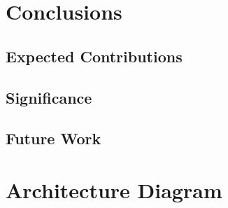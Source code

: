 \documentclass[12pt, a4paper]{article}
\begin{document}
\section{Conclusions}
\label{sec:conclusions}

\subsection{Expected Contributions}


\subsection{Significance}

\subsection{Future Work}


\newpage
\printbibliography

\newpage
\appendix
\section{Architecture Diagram}
\label{app:diagram}
\end{document}
